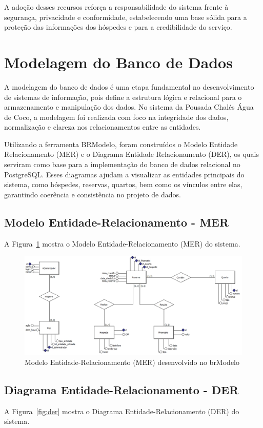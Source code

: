 \documentclass[
	12pt,				%
	openany,			%
	oneside,			%
	a4paper,			%
	english,			%
	french,				%
	spanish,			%
	brazil				%
	]{abntex2}
\begin{document}
A adoção desses recursos reforça a responsabilidade do sistema frente à segurança, privacidade e conformidade, estabelecendo uma base sólida para a proteção das informações dos hóspedes e para a credibilidade do serviço.


\section{Modelagem do Banco de Dados}
A modelagem do banco de dados é uma etapa fundamental no desenvolvimento de sistemas de informação, pois define a estrutura lógica e relacional para o armazenamento e manipulação dos dados. No sistema da Pousada Chalés Água de Coco, a modelagem foi realizada com foco na integridade dos dados, normalização e clareza nos relacionamentos entre as entidades.

Utilizando a ferramenta BRModelo, foram construídos o Modelo Entidade Relacionamento (MER) e o Diagrama Entidade Relacionamento (DER), os quais serviram como base para a implementação do banco de dados relacional no PostgreSQL. Esses diagramas ajudam a visualizar as entidades principais do sistema, como hóspedes, reservas, quartos, bem como os vínculos entre elas, garantindo coerência e consistência no projeto de dados.
\subsection{Modelo Entidade-Relacionamento - MER}

A Figura~\ref{fig:mer} mostra o Modelo Entidade-Relacionamento (MER) do sistema.

\begin{figure}[h!]
	\centering
	\includegraphics[width=\textwidth]{0406-MER.jpg}
	\caption{Modelo Entidade-Relacionamento (MER) desenvolvido no brModelo}
	\label{fig:mer}
\end{figure}
\subsection{Diagrama Entidade-Relacionamento - DER}
A Figura~\ref{fig:der} mostra o Diagrama Entidade-Relacionamento (DER) do sistema.
\end{document}
